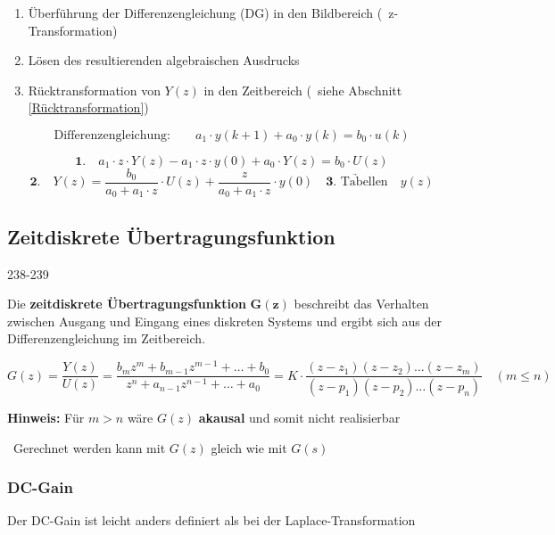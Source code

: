 \smallskip

\begin{enumerate}
    \item Überführung der Differenzengleichung (DG) in den Bildbereich (\textrightarrow\ z-Transformation)
    \item Lösen des resultierenden algebraischen Ausdrucks
    \item Rücktransformation von $Y(z)$ in den Zeitbereich (\textrightarrow\ siehe Abschnitt \ref{Rücktransformation})
\end{enumerate}


$$ \text{Differenzengleichung:} \qquad  a_1 \cdot y(k+1) + a_0 \cdot y(k) = b_0 \cdot u(k) $$

\vspace{-0.2cm}

$$ \bm{1.} \quad a_1 \cdot z \cdot Y(z) - a_1 \cdot z \cdot y(0) + a_0 \cdot Y(z) = b_0 \cdot U(z) $$
$$ \bm{2.} \quad Y(z) = \frac{b_0}{a_0 + a_1 \cdot z} \cdot U(z) + \frac{z}{a_0 + a_1 \cdot z} \cdot y(0) \quad \underrightarrow{\bm{3.} \text{ Tabellen}} \quad y(z) $$ 


\subsection{Zeitdiskrete Übertragungsfunktion}{238-239}

Die \textbf{zeitdiskrete Übertragungsfunktion} $\bm{G(z)}$ beschreibt das Verhalten zwischen Ausgang und Eingang eines diskreten 
Systems und ergibt sich aus der Differenzengleichung im Zeitbereich.

\vspace{-0.4cm}

$$ G(z) = \frac{Y(z)}{U(z)} = \frac{b_m z^m + b_{m-1} z^{m-1} + \ldots + b_0}{z^n + a_{n-1} z^{n-1} + \ldots + a_0} = K \cdot \frac{(z - z_1) (z - z_2) \ldots (z - z_m)}{(z - p_1) (z - p_2) \ldots (z - p_n)} \quad (m \leq n)$$

\textbf{Hinweis:} Für $m > n$ wäre $G(z)$ \textbf{akausal} und somit nicht realisierbar

\smallskip

\textrightarrow\ Gerechnet werden kann mit $G(z)$ gleich wie mit $G(s)$


\subsubsection{DC-Gain}

Der DC-Gain ist leicht anders definiert als bei der Laplace-Transformation

